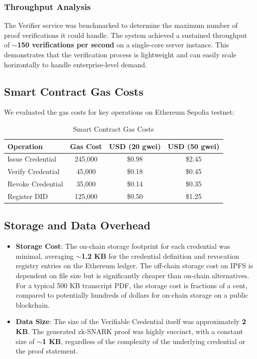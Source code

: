 \documentclass[conference]{IEEEtran}
\begin{document}
\subsubsection{Throughput Analysis}

The Verifier service was benchmarked to determine the maximum number of proof verifications it could handle. The system achieved a sustained throughput of \textbf{$\sim$150 verifications per second} on a single-core server instance. This demonstrates that the verification process is lightweight and can easily scale horizontally to handle enterprise-level demand.

\subsection{Smart Contract Gas Costs}

We evaluated the gas costs for key operations on Ethereum Sepolia testnet:

\begin{table}[htbp]
\caption{Smart Contract Gas Costs}
\centering
\footnotesize
\begin{tabular}{|l|c|c|c|}
\hline
\textbf{Operation} & \textbf{Gas Cost} & \textbf{USD (20 gwei)} & \textbf{USD (50 gwei)} \\
\hline
Issue Credential & 245,000 & \$0.98 & \$2.45 \\
Verify Credential & 45,000 & \$0.18 & \$0.45 \\
Revoke Credential & 35,000 & \$0.14 & \$0.35 \\
Register DID & 125,000 & \$0.50 & \$1.25 \\
\hline
\end{tabular}
\end{table}

\subsection{Storage and Data Overhead}

\begin{itemize}
    \item \textbf{Storage Cost}: The on-chain storage footprint for each credential was minimal, averaging \textbf{$\sim$1.2 KB} for the credential definition and revocation registry entries on the Ethereum ledger. The off-chain storage cost on IPFS is dependent on file size but is significantly cheaper than on-chain alternatives. For a typical 500 KB transcript PDF, the storage cost is fractions of a cent, compared to potentially hundreds of dollars for on-chain storage on a public blockchain.
    
    \item \textbf{Data Size}: The size of the Verifiable Credential itself was approximately \textbf{2 KB}. The generated zk-SNARK proof was highly succinct, with a constant size of \textbf{$\sim$1 KB}, regardless of the complexity of the underlying credential or the proof statement.
\end{itemize}
\end{document}
